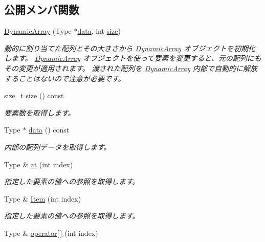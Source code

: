 \subsection*{公開メンバ関数}
\begin{DoxyCompactItemize}
\item 
\hyperlink{class_dynamic_array_a963b26e158a87cd8b81be8dfae867f27}{Dynamic\+Array} (Type $\ast$\hyperlink{class_dynamic_array_a4d38117f244e69a7eb5721f618a1d26b}{data}, int \hyperlink{class_dynamic_array_a9b9ebf1cb333a8a582e2b5712c502e61}{size})
\begin{DoxyCompactList}\small\item\em 動的に割り当てた配列とその大きさから \hyperlink{class_dynamic_array}{Dynamic\+Array} オブジェクトを初期化します。 \hyperlink{class_dynamic_array}{Dynamic\+Array} オブジェクトを使って要素を変更すると、元の配列にもその変更が適用されます。 渡された配列を \hyperlink{class_dynamic_array}{Dynamic\+Array} 内部で自動的に解放することはないので注意が必要です。 \end{DoxyCompactList}\item 
size\+\_\+t \hyperlink{class_dynamic_array_a9b9ebf1cb333a8a582e2b5712c502e61}{size} () const 
\begin{DoxyCompactList}\small\item\em 要素数を取得します。\end{DoxyCompactList}\item 
Type $\ast$ \hyperlink{class_dynamic_array_a4d38117f244e69a7eb5721f618a1d26b}{data} () const 
\begin{DoxyCompactList}\small\item\em 内部の配列データを取得します。\end{DoxyCompactList}\item 
Type \& \hyperlink{class_dynamic_array_a5b4a10a09d1930bff5d9503728cc3359}{at} (int index)
\begin{DoxyCompactList}\small\item\em 指定した要素の値への参照を取得します。\end{DoxyCompactList}\item 
Type \& \hyperlink{class_dynamic_array_ac4f2c6bdbb12c76adbc1338323b50165}{Item} (int index)
\begin{DoxyCompactList}\small\item\em 指定した要素の値への参照を取得します。\end{DoxyCompactList}\item 
Type \& \hyperlink{class_dynamic_array_a6a636edafe46560e08c9a940bfba152d}{operator\mbox{[}$\,$\mbox{]}} (int index)

\end{DoxyCompactItemize}
